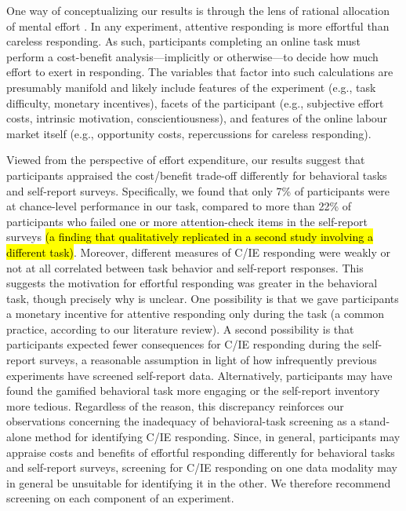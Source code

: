 \documentclass[a4paper,notitlepage,12pt]{article}
\begin{document}
\begin{refsection}[main]
One way of conceptualizing our results is through the lens of rational allocation of mental effort \cite{kool2018mental}. In any experiment, attentive responding is more effortful than careless responding. As such, participants completing an online task must perform a cost-benefit analysis---implicitly or otherwise---to decide how much effort to exert in responding. The variables that factor into such calculations are presumably manifold and likely include features of the experiment (e.g., task difficulty, monetary incentives), facets of the participant (e.g., subjective effort costs, intrinsic motivation, conscientiousness), and features of the online labour market itself (e.g., opportunity costs, repercussions for careless responding). 

Viewed from the perspective of effort expenditure, our results suggest that participants appraised the cost/benefit trade-off differently for behavioral tasks and self-report surveys. Specifically, we found that only 7\% of participants were at chance-level performance in our task, compared to more than 22\% of participants who failed one or more attention-check items in the self-report surveys \hl{(a finding that qualitatively replicated in a second study involving a different task)}. Moreover, different measures of C/IE responding were weakly or not at all correlated between task behavior and self-report responses. This suggests the motivation for effortful responding was greater in the behavioral task, though precisely why is unclear. One possibility is that we gave participants a monetary incentive for attentive responding only during the task (a common practice, according to our literature review). A second possibility is that participants expected fewer consequences for C/IE responding during the self-report surveys, a reasonable assumption in light of how infrequently previous experiments have screened self-report data. Alternatively, participants may have found the gamified behavioral task more engaging or the self-report inventory more tedious. Regardless of the reason, this discrepancy reinforces our observations concerning the inadequacy of behavioral-task screening as a stand-alone method for identifying C/IE responding. Since, in general, participants may appraise costs and benefits of effortful responding differently for behavioral tasks and self-report surveys, screening for C/IE responding on one data modality may in general be unsuitable for identifying it in the other. We therefore recommend screening on each component of an experiment.


\end{refsection}
\end{document}
